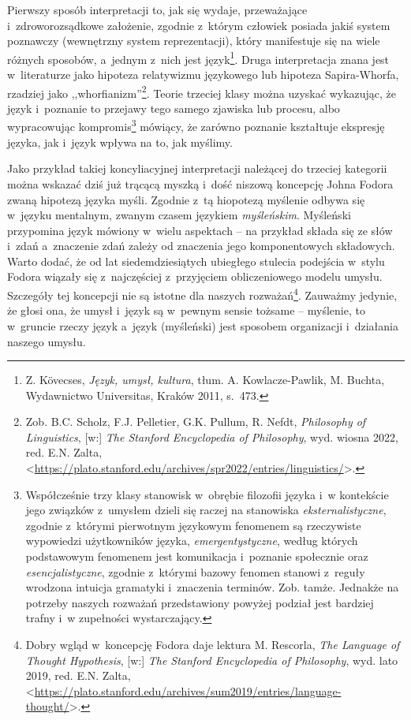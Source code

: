 Pierwszy sposób interpretacji to, jak się wydaje, przeważające i~zdroworozsądkowe założenie, zgodnie z~którym człowiek posiada jakiś system poznawczy (wewnętrzny system reprezentacji), który manifestuje się na wiele różnych sposobów, a~jednym z~nich jest język\footnote{Z. Kövecses, \textit{Język, umysł, kultura}, tłum. A. Kowlacze-Pawlik, M. Buchta, Wydawnictwo Universitas, Kraków 2011, s.~473.}. Druga interpretacja znana jest w~literaturze jako hipoteza relatywizmu językowego lub hipoteza Sapira-Whorfa, rzadziej jako ,,whorfianizm''\footnote{Zob. B.C. Scholz, F.J. Pelletier, G.K. Pullum, R. Nefdt, \textit{Philosophy of Linguistics}, [w:] \textit{The Stanford Encyclopedia of Philosophy}, wyd. wiosna 2022, red. E.N. Zalta, <\url{https://plato.stanford.edu/archives/spr2022/entries/linguistics/}>.}. Teorie trzeciej klasy można uzyskać wykazując, że język i~poznanie to przejawy tego samego zjawiska lub procesu, albo wypracowując kompromis\footnote{Współcześnie trzy klasy stanowisk w~obrębie filozofii języka i~w kontekście jego związków z~umysłem dzieli się raczej na stanowiska \textit{eksternalistyczne}, zgodnie z~którymi pierwotnym językowym fenomenem są rzeczywiste wypowiedzi użytkowników języka, \textit{emergentystyczne}, według których podstawowym fenomenem jest komunikacja i~poznanie społecznie oraz \textit{esencjalistyczne}, zgodnie z~którymi bazowy fenomen stanowi z~reguły wrodzona intuicja gramatyki i~znaczenia terminów. Zob. tamże. Jednakże na potrzeby naszych rozważań przedstawiony powyżej podział jest bardziej trafny i~w zupełności wystarczający.} mówiący, że zarówno poznanie kształtuje ekspresję języka, jak i~język wpływa na to, jak myślimy.

Jako przykład takiej koncyliacyjnej interpretacji należącej do trzeciej kategorii można wskazać dziś już trącącą myszką i~dość niszową koncepcję Johna Fodora zwaną hipotezą języka myśli. Zgodnie z~tą hiopotezą myślenie odbywa się w~języku mentalnym, zwanym czasem językiem \textit{myśleńskim}. Myśleński przypomina język mówiony w~wielu aspektach -- na przykład składa się ze słów i~zdań a~znaczenie zdań zależy od znaczenia jego komponentowych składowych. Warto dodać, że od lat siedemdziesiątych ubiegłego stulecia podejścia w~stylu Fodora wiązały się z~najczęściej z~przyjęciem obliczeniowego modelu umysłu. Szczegóły tej koncepcji nie są istotne dla naszych rozważań\footnote{Dobry wgląd w~koncepcję Fodora daje lektura M. Rescorla, \textit{The Language of Thought Hypothesis}, [w:] \textit{The Stanford Encyclopedia of Philosophy}, wyd. lato 2019, red. E.N. Zalta, <\url{https://plato.stanford.edu/archives/sum2019/entries/language-thought/}>.}. Zauważmy jedynie, że głosi ona, że umysł i~język są w~pewnym sensie tożsame -- myślenie, to w~gruncie rzeczy język a~język (myśleński) jest sposobem organizacji i~działania naszego umysłu.

